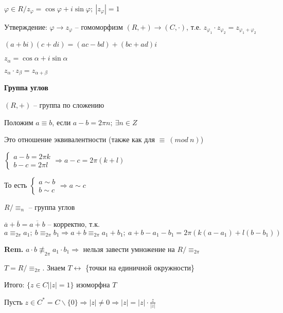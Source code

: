 \documentclass[14pt, letter paper]{article}
\begin{document}
\vspace{5mm}

$\varphi \in R/ z_\varphi = \cos \varphi + i\sin \varphi;\ |z_\varphi| = 1$

Утверждение: $\varphi \rightarrow z_\varphi$ -- гомоморфизм $(R, +) \rightarrow (C, \cdot)$, т.е. $z_{\varphi_1} \cdot z_{\varphi_2} = z_{\varphi_1 + \varphi_2}$

\vspace{2mm}

$(a + bi)(c + di) = (ac - bd) + (bc + ad)i$

$z_\alpha = \cos{\alpha} + i\sin{\alpha}$

$z_\alpha \cdot z_\beta = z_{\alpha + \beta}$

\vspace{2mm}

\textbf{Группа углов}

$(R, +)$ -- группа по сложению

Положим $a \equiv b$, если $a - b = 2\pi n;\ \exists n \in Z$

Это отношение эквивалентности (также как для $\equiv\ (mod\ n)$)

$\begin{cases}
    a - b = 2\pi k \\
    b - c = 2\pi l
\end{cases} \Rightarrow a - c = 2 \pi (k + l)$

То есть $\begin{cases}
    a \sim b \\
    b \sim c 
\end{cases} \Rightarrow a \sim c$

$R/\equiv_n$ -- группа углов

$\overline{a} + \overline{b} = \overline{a + b}$ -- корректно, т.к. $a \equiv_{2\pi} a_1;\ b \equiv_{2\pi} b_1 \Rightarrow a + b \equiv_{2\pi} a_1 + b_1;\ a + b - a_1 - b_1 = 2\pi(k(a - a_1) + l(b - b_1))$

\textbf{Rem.} $a \cdot b \not\equiv_{2\pi} a_1 \cdot b_1 \Rightarrow$ нельзя завести умножение на $R/\equiv_{2\pi}$

\vspace{3mm}

$T = R/\equiv_{2\pi}$. Знаем $T \leftrightarrow$ \{точки на единичной окружности\}

Итого: $\{ z \in C | |z| = 1\}$ изоморфна $T$

\vspace{5mm}

Пусть $z \in C^* = C\backslash\{0\} \Rightarrow |z| \neq 0 \Rightarrow |z| = |z| \cdot \frac{z}{|z|}$
\end{document}
